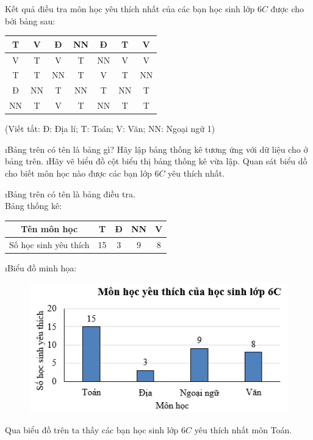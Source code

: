 \begin{bt}
	Kết quả điều tra môn học yêu thích nhất của các bạn học sinh lớp $6C$ được cho bởi bảng sau:
	\begin{center}
		\begin{tabular}{|c|c|c|c|c|c|c|}
			\hline
			T&	V&	Đ&	NN&	Đ&	T&	V\\
			\hline
			V&	T&	V&	T&	NN&	V&	V\\
			\hline
			T&	T&	NN&	T&	V&	T&	NN\\
			\hline
			Đ&	NN&	T&	NN&	T&	NN&	T\\
			\hline
			NN&	T&	V&	T&	NN&	T&	T\\
			\hline
		\end{tabular}
		
		\vspace*{5pt}
		(Viết tắt: Đ: Địa lí; T: Toán; V: Văn; NN: Ngoại ngữ 1)
	\end{center}
	\begin{enumerate}[a),leftmargin=*]
		\i Bảng trên có tên là bảng gì? Hãy lập bảng thống kê tương ứng với dữ liệu cho ở bảng trên.
		\i Hãy vẽ biểu đồ cột biểu thị bảng thống kê vừa lập. Quan sát biểu dồ cho biết môn học nào được các bạn lớp $6C$ yêu thích nhất.
	\end{enumerate}
	\begin{loigiaichuong40}
		\begin{enumerate}[a),leftmargin=*]
			\i	Bảng trên có tên là bảng điều tra.\\
			Bảng thống kê:
			\begin{center}
				\begin{tabular}{|c|c|c|c|c|}
					\hline
					Tên môn học&	T&	Đ&	NN&	V\\
					\hline
					Số học sinh yêu thích&	15&	3&	9&	8\\
					\hline
				\end{tabular}
			\end{center}
			\i	Biểu đồ minh họa:
			\begin{figure}[H]
				\centering
				\vspace*{-5pt}
				\captionsetup{labelformat= empty, justification=centering}
				\includegraphics[width=0.5\linewidth]{11}
				\vspace*{-10pt}
			\end{figure}
			Qua biểu đồ trên ta thấy các bạn học sinh lớp $6C$ yêu thích nhất môn Toán.
		\end{enumerate}
	\end{loigiaichuong40}
\end{bt}
